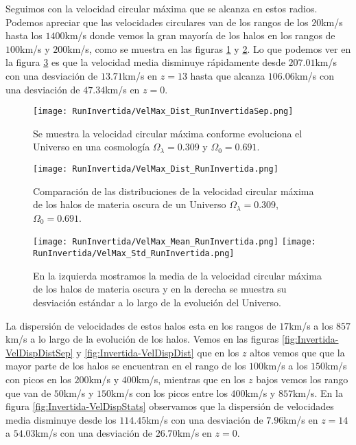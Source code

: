 Seguimos con la velocidad circular máxima que se alcanza en estos radios. Podemos apreciar que las velocidades circulares van de los rangos de los $20$km/s hasta los $1400$km/s donde vemos la gran mayoría de los halos en los rangos de $100$km/s y $200$km/s, como se muestra en las figuras \ref{fig:Invertida-VelMaxDistSep} y \ref{fig:Invertida-VelMaxDist}. Lo que podemos ver en la figura \ref{fig:Invertida-VelMaxStats} es que la velocidad  media disminuye rápidamente desde $207.01$km/s con una desviación de $13.71$km/s en $z=13$ hasta que alcanza $106.06$km/s con una desviación de $47.34$km/s en $z=0$. 

\begin{figure}[H]
    \centering
    \texttt{[image: RunInvertida/VelMax\_Dist\_RunInvertidaSep.png]}
    \caption[Velocidad circular máxima]{\footnotesize Se muestra la velocidad circular máxima conforme evoluciona el Universo en una cosmología $\Omega_\lambda = 0.309 $ y $\Omega_0 = 0.691$.}
    \label{fig:Invertida-VelMaxDistSep}
\end{figure}

\begin{figure}[H]
    \centering
    \texttt{[image: RunInvertida/VelMax\_Dist\_RunInvertida.png]}
    \caption[Distribución de la velocidad circular máxima]{\footnotesize Comparación de las distribuciones de la velocidad circular máxima de los halos de materia oscura de un Universo $\Omega_\lambda = 0.309 $, $\Omega_0 = 0.691$.}
    \label{fig:Invertida-VelMaxDist}
\end{figure}

\begin{figure}[H]
    \centering
    \texttt{[image: RunInvertida/VelMax\_Mean\_RunInvertida.png]}
    \texttt{[image: RunInvertida/VelMax\_Std\_RunInvertida.png]}
    \caption[Media y desviación estándar de la velocidad circular máxima]{\footnotesize En la izquierda mostramos la media de la velocidad circular máxima de los halos de materia oscura y en la derecha se muestra su desviación estándar a lo largo de la evolución del Universo.}
    \label{fig:Invertida-VelMaxStats}
\end{figure}


La dispersión de velocidades de estos halos esta en los rangos de $17$km/s a los $857$km/s a lo largo de la evolución de los halos. Vemos en las figuras \ref{fig:Invertida-VelDispDistSep} y \ref{fig:Invertida-VelDispDist} que en los $z$ altos vemos que que la mayor parte de los halos se encuentran en el rango de los $100$km/s a los $150$km/s con picos en los $200$km/s y $400$km/s, mientras que en los $z$ bajos vemos los rango que van de $50$km/s y $150$km/s con los picos entre los $400$km/s y $857$km/s. En la figura \ref{fig:Invertida-VelDispStats} observamos que la dispersión de velocidades media disminuye desde los $114.45$km/s con una desviación de $7.96$km/s en $z=14$ a $54.03$km/s con una desviación de $26.70$km/s en $z=0$.



